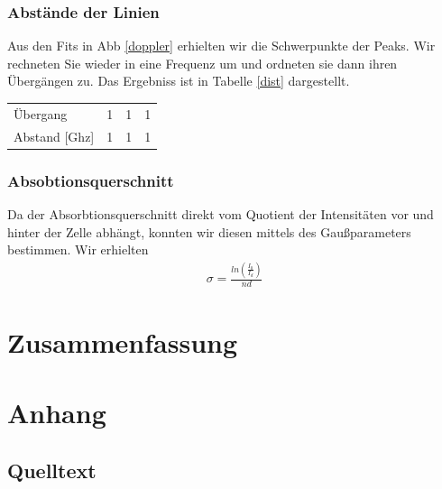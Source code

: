 \documentclass[12pt]{article}
\begin{document}
\subsubsection{Abstände der Linien}
Aus den Fits in Abb \ref{doppler} erhielten wir die Schwerpunkte der Peaks. Wir rechneten Sie wieder in eine Frequenz um und ordneten sie dann ihren Übergängen zu. Das Ergebniss ist in Tabelle \ref{dist} dargestellt.
\begin{center}
\begin{tabular}{|l|lll|}
\hline
\label{dist}
Übergang & 1 & 1 & 1\\
Abstand [Ghz] & 1 & 1 & 1\\
\hline
\end{tabular}
\end{center}
\subsubsection{Absobtionsquerschnitt}
Da der Absorbtionsquerschnitt direkt vom Quotient der Intensitäten vor und hinter der Zelle abhängt, konnten wir diesen mittels des Gaußparameters bestimmen.
Wir erhielten
\begin{align*}
 \sigma = \frac{ln \left( \frac{I_0}{I_d} \right) }{nd}
\end{align*}
\section{Zusammenfassung}
\section{Anhang}


\subsection{Quelltext}

%
\end{document}
